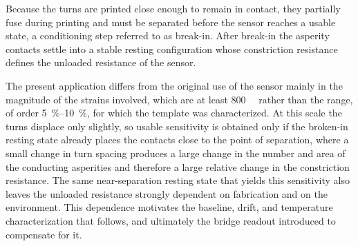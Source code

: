 Because the turns are printed close enough to remain in contact, they partially fuse during printing and must be separated before the sensor reaches a usable state, a conditioning step referred to as break-in. After break-in the asperity contacts settle into a stable resting configuration whose constriction resistance defines the unloaded resistance of the sensor.

The present application differs from the original use of the sensor mainly in the magnitude of the strains involved, which are at least \SI{800}{\micro\strain} rather than the range, of order \SIrange{5}{10}{\percent}, for which the template was characterized. At this scale the turns displace only slightly, so usable sensitivity is obtained only if the broken-in resting state already places the contacts close to the point of separation, where a small change in turn spacing produces a large change in the number and area of the conducting asperities and therefore a large relative change in the constriction resistance. The same near-separation resting state that yields this sensitivity also leaves the unloaded resistance strongly dependent on fabrication and on the environment. This dependence motivates the baseline, drift, and temperature characterization that follows, and ultimately the bridge readout introduced to compensate for it.